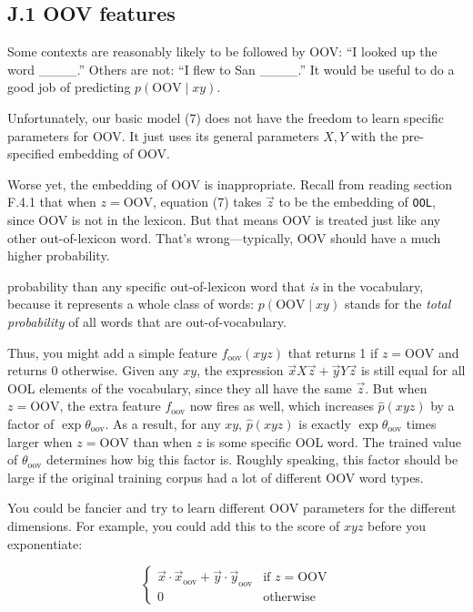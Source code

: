 \subsection*{J.1 OOV features}

Some contexts are reasonably likely to be followed by OOV: “I looked up the word \_\_\_\_.” Others are not: “I flew to San \_\_\_\_.” It would be useful to do a good job of predicting $p(\text{OOV} \mid xy)$.

Unfortunately, our basic model (7) does not have the freedom to learn specific parameters for OOV. It just uses its general parameters $X, Y$ with the pre-specified embedding of OOV.

Worse yet, the embedding of OOV is inappropriate. Recall from reading section F.4.1 that when $z=\text{OOV}$, equation (7) takes $\vec{z}$ to be the embedding of \texttt{OOL}, since OOV is not in the lexicon. But that means OOV is treated just like any other out-of-lexicon word. That’s wrong—typically, OOV should have a much higher probability.

probability than any specific out-of-lexicon word that \emph{is} in the vocabulary, because it represents a whole 
class of words: $p(\text{OOV} \mid xy)$ stands for the \emph{total probability} of all words that are out-of-vocabulary. 

Thus, you might add a simple feature $f_{\text{oov}}(xyz)$ that returns 1 if $z = \text{OOV}$ and returns 0 otherwise. 
Given any $xy$, the expression $\vec{x}X\vec{z} + \vec{y}Y\vec{z}$ is still equal for all OOL elements of the vocabulary, since they 
all have the same $\vec{z}$. But when $z = \text{OOV}$, the extra feature $f_{\text{oov}}$ now fires as well, which increases $\hat{p}(xyz)$ 
by a factor of $\exp \theta_{\text{oov}}$. As a result, for any $xy$, $\hat{p}(xyz)$ is exactly $\exp \theta_{\text{oov}}$ times larger when $z = \text{OOV}$ than 
when $z$ is some specific OOL word. The trained value of $\theta_{\text{oov}}$ determines how big this factor is. Roughly 
speaking, this factor should be large if the original training corpus had a lot of different OOV word types. 

You could be fancier and try to learn different OOV parameters for the different dimensions. For example, 
you could add this to the score of $xyz$ before you exponentiate: 

\[
\begin{cases}
\vec{x}\cdot \vec{x}_{\text{oov}} + \vec{y}\cdot \vec{y}_{\text{oov}} & \text{if } z = \text{OOV} \\
0 & \text{otherwise}
\end{cases} \tag{25}
\]

